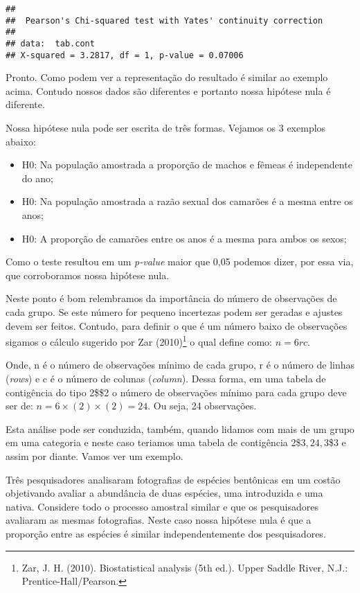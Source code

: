 \documentclass[14pt,titlepage, oneside, openany, a4paper]{book}
\begin{document}
\begin{verbatim}
## 
##  Pearson's Chi-squared test with Yates' continuity correction
## 
## data:  tab.cont
## X-squared = 3.2817, df = 1, p-value = 0.07006
\end{verbatim}

Pronto. Como podem ver a representação do resultado é similar ao exemplo acima. Contudo nossos dados são diferentes e portanto nossa hipótese nula é diferente.

Nossa hipótese nula pode ser escrita de três formas. Vejamos os 3 exemplos abaixo:

\begin{itemize}
\item
  H0: Na população amostrada a proporção de machos e fêmeas é independente do ano;
\item
  H0: Na população amostrada a razão sexual dos camarões é a mesma entre os anos;
\item
  H0: A proporção de camarões entre os anos é a mesma para ambos os sexos;
\end{itemize}

Como o teste resultou em um \emph{p-value} maior que 0,05 podemos dizer, por essa via, que corroboramos nossa hipótese nula.

Neste ponto é bom relembramos da importância do número de observações de cada grupo. Se este número for pequeno incertezas podem ser geradas e ajustes devem ser feitos. Contudo, para definir o que é um número baixo de observações sigamos o cálculo sugerido por Zar (2010)\footnote{Zar, J. H. (2010). Biostatistical analysis (5th ed.). Upper Saddle River, N.J.: Prentice-Hall/Pearson.} o qual define como: \(n = 6rc\).

Onde, n é o número de observações mínimo de cada grupo, r é o número de linhas (\emph{rows}) e c é o número de colunas (\emph{column}). Dessa forma, em uma tabela de contigência do tipo 2\$\times\$2 o número de observações mínimo para cada grupo deve ser de: \(n = 6 \times (2) \times (2) = 24\). Ou seja, 24 observações.

Esta análise pode ser conduzida, também, quando lidamos com mais de um grupo em uma categoria e neste caso teriamos uma tabela de contigência 2\$\times\(3, 2\)\times\(4, 3\)\times\$3 e assim por diante. Vamos ver um exemplo.

Três pesquisadores analisaram fotografias de espécies bentônicas em um costão objetivando avaliar a abundância de duas espécies, uma introduzida e uma nativa. Considere todo o processo amostral similar e que os pesquisadores avaliaram as mesmas fotografias. Neste caso nossa hipótese nula é que a proporção entre as espécies é similar independentemente dos pesquisadores.
\end{document}
